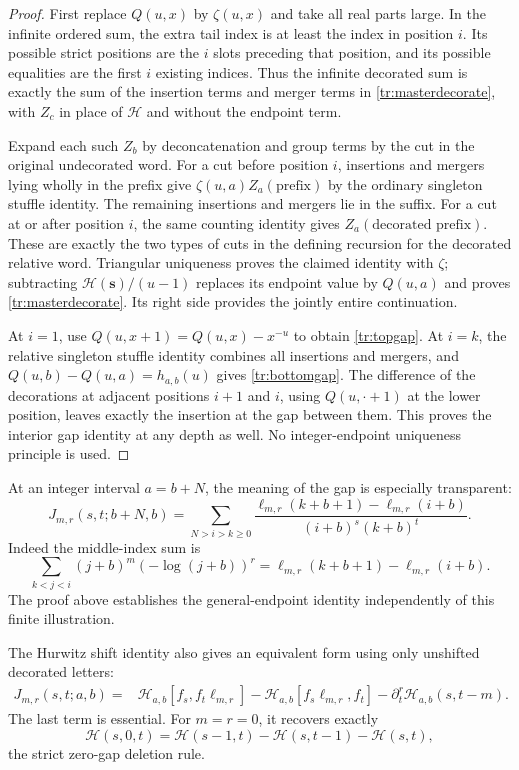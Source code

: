 \documentclass[11pt,letterpaper]{article}
\numberwithin{equation}{section}
\theoremstyle{plain}
\theoremstyle{definition}
\theoremstyle{remark}
\newcommand{\HH}{\mathcal H}
\begin{document}
\begin{proof}
First replace $Q(u,x)$ by $\zeta(u,x)$ and take all real parts
large. In the infinite ordered sum, the extra tail index is at least
the index in position $i$. Its possible strict positions are the $i$
slots preceding that position, and its possible equalities are the
first $i$ existing indices. Thus the infinite decorated sum is exactly
the sum of the insertion terms and merger terms in
\eqref{tr:masterdecorate}, with $Z_c$ in place of $\HH$ and
without the endpoint term.

Expand each such $Z_b$ by deconcatenation and group terms by the cut
in the original undecorated word. For a cut before position $i$,
insertions and mergers lying wholly in the prefix give
$\zeta(u,a)Z_a(\text{prefix})$ by the ordinary singleton stuffle
identity. The remaining insertions and mergers lie in the suffix.
For a cut at or after position $i$, the same counting identity gives
$Z_a(\text{decorated prefix})$. These are exactly the two types
of cuts in the defining recursion for the decorated relative word.
Triangular uniqueness proves the claimed identity with $\zeta$;
subtracting $\HH(\boldsymbol s)/(u-1)$ replaces its endpoint value
by $Q(u,a)$ and proves \eqref{tr:masterdecorate}. Its right side
provides the jointly entire continuation.

At $i=1$, use $Q(u,x+1)=Q(u,x)-x^{-u}$ to obtain
\eqref{tr:topgap}. At $i=k$, the relative singleton stuffle identity
combines all insertions and mergers, and
$Q(u,b)-Q(u,a)=h_{a,b}(u)$ gives \eqref{tr:bottomgap}.
The difference of the decorations at adjacent positions $i+1$ and $i$,
using $Q(u,\cdot+1)$ at the lower position, leaves exactly the
insertion at the gap between them. This proves the interior gap
identity at any depth as well. No integer-endpoint uniqueness principle
is used.
\end{proof}

At an integer interval $a=b+N$, the meaning of the gap is especially
transparent:
\begin{equation}\label{tr:finitegap}
 J_{m,r}(s,t;b+N,b)=
 \sum_{N>i>k\geq0}
 \frac{\ell_{m,r}(k+b+1)-\ell_{m,r}(i+b)}
      {(i+b)^s(k+b)^t}.
\end{equation}
Indeed the middle-index sum is
\[
 \sum_{k<j<i}(j+b)^m(-\log(j+b))^r
           =\ell_{m,r}(k+b+1)-\ell_{m,r}(i+b).
\]
The proof above establishes the general-endpoint identity independently
of this finite illustration.

The Hurwitz shift identity also gives an equivalent form using only
unshifted decorated letters:
\begin{align}
 J_{m,r}(s,t;a,b)
   ={}&\HH_{a,b}[f_s,f_t\ell_{m,r}]
       -\HH_{a,b}[f_s\ell_{m,r},f_t]
       -\partial_t^r\HH_{a,b}(s,t-m).
 \label{tr:commutator}
\end{align}
The last term is essential. For $m=r=0$, it recovers exactly
\[
 \HH(s,0,t)=\HH(s-1,t)-\HH(s,t-1)-\HH(s,t),
\]
the strict zero-gap deletion rule.
\end{document}
